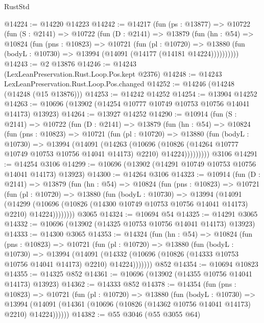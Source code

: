 \begin{lexlean}{RustStd}
\begin{coremodule}
@14224 := @14220 @14223
@14242 := @14217
    (fun (ps : @13877) =>
    @10722
      (fun (S : @2141) =>
      @10722
        (fun (D : @2141) =>
        @13879
          (fun (hn : @54) =>
          @10824
            (fun (pns : @10823) =>
            @10721
              (fun (pl : @10720) =>
              @13880 (fun (bodyL : @10730) => @13994 (@14091 (@14177 (@14181 @14224))))))))))
@14243 := @2 @13876
@14246 := @14243 (LexLeanPreservation.Rust.Loop.Pos.kept @2376)
@14248 := @14243 LexLeanPreservation.Rust.Loop.Pos.changed
@14252 := @14246 (@14248 (@14248 (@15 @13876)))
@14253 := @14242 @14252
@14254 := @13904 @14252
@14263 := @10696 (@13902 (@14254 @10777 @10749 @10753 @10756 @14041 @14173) @13923)
@14264 := @13927 @14252
@14290 := @10914
    (fun (S : @2141) =>
    @10722
      (fun (D : @2141) =>
      @13879
        (fun (hn : @54) =>
        @10824
          (fun (pns : @10823) =>
          @10721
            (fun (pl : @10720) =>
            @13880
              (fun (bodyL : @10730) =>
              @13994
                (@14091
                  (@14263
                    (@10696
                      (@10826 (@14264 @10777 @10749 @10753 @10756 @14041 @14173) @2210)
                      @14224)))))))))
    @3106
@14291 := @14254 @3106
@14299 := @10696 (@13902 (@14291 @10749 @10753 @10756 @14041 @14173) @13923)
@14300 := @14264 @3106
@14323 := @10914
    (fun (D : @2141) =>
    @13879
      (fun (hn : @54) =>
      @10824
        (fun (pns : @10823) =>
        @10721
          (fun (pl : @10720) =>
          @13880
            (fun (bodyL : @10730) =>
            @13994
              (@14091
                (@14299
                  (@10696 (@10826 (@14300 @10749 @10753 @10756 @14041 @14173) @2210) @14224))))))))
    @3065
@14324 := @10694 @54
@14325 := @14291 @3065
@14332 := @10696 (@13902 (@14325 @10753 @10756 @14041 @14173) @13923)
@14333 := @14300 @3065
@14353 := @14324
    (fun (hn : @54) =>
    @10824
      (fun (pns : @10823) =>
      @10721
        (fun (pl : @10720) =>
        @13880
          (fun (bodyL : @10730) =>
          @13994
            (@14091
              (@14332 (@10696 (@10826 (@14333 @10753 @10756 @14041 @14173) @2210) @14224)))))))
    @852
@14354 := @10694 @10823
@14355 := @14325 @852
@14361 := @10696 (@13902 (@14355 @10756 @14041 @14173) @13923)
@14362 := @14333 @852
@14378 := @14354
    (fun (pns : @10823) =>
    @10721
      (fun (pl : @10720) =>
      @13880
        (fun (bodyL : @10730) =>
        @13994 (@14091 (@14361 (@10696 (@10826 (@14362 @10756 @14041 @14173) @2210) @14224))))))
@14382 := @55 @3046 (@55 @3055 @64)

\end{coremodule}
\end{lexlean}
